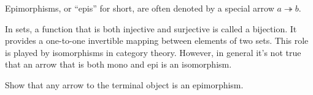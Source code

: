 \documentclass[DaoFP]{subfiles}
\begin{document}
Epimorphisms, or ``epis'' for short, are often denoted by a special arrow $a \twoheadrightarrow b$.

In sets, a function that is both injective and surjective is called a bijection. It provides a one-to-one invertible mapping between elements of two sets. This role is played by isomorphisms in category theory. However, in general it's not true that an arrow that is both mono and epi is an isomorphism.

\begin{exercise}
Show that any arrow to the terminal object is an epimorphism.
\end{exercise}
\end{document}
